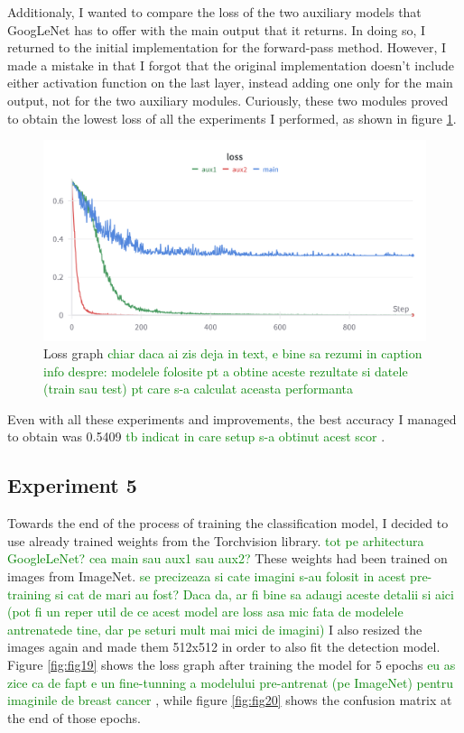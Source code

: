 Additionaly, I wanted to compare the loss of the two auxiliary models that GoogLeNet has to offer with the main output that it returns. In doing so, I returned to the initial implementation for the forward-pass method. However, I made a mistake in that I forgot that the original implementation doesn't include either activation function on the last layer, instead adding one only for the main output, not for the two auxiliary modules. Curiously, these two modules proved to obtain the lowest loss of all the experiments I performed, as shown in figure \ref{fig:fig18}.

\begin{figure}[!ht]
    \centering
    \includegraphics[width=1\linewidth]{figures/Figure19.png}
    \caption{Loss graph
    \textcolor{green}{chiar daca ai zis deja in text, e bine sa rezumi in caption info despre: modelele folosite pt a obtine aceste rezultate si datele (train sau test) pt care s-a calculat aceasta performanta}
    }
    \label{fig:fig18}
\end{figure}

Even with all these experiments and improvements, the best accuracy I managed to obtain was 0.5409
\textcolor{green}{tb indicat in care setup s-a obtinut acest scor}
.

\subsection{Experiment 5}

Towards the end of the process of training the classification model, I decided to use already trained weights from the Torchvision library.
\textcolor{green}{tot pe arhitectura GoogleLeNet? cea main sau aux1 sau aux2?} 
These weights had been trained on images from ImageNet.
\textcolor{green}{se precizeaza si cate imagini s-au folosit in acest pre-training si cat de mari au fost? Daca da, ar fi bine sa adaugi aceste detalii si aici (pot fi un reper util de ce acest model are loss asa mic fata de modelele antrenatede tine, dar pe seturi mult mai mici de imagini)} 
I also resized the images again and made them 512x512 in order to also fit the detection model. Figure \ref{fig:fig19} shows the loss graph after training the model for 5 epochs
\textcolor{green}{eu as zice ca de fapt e un fine-tunning a modelului pre-antrenat (pe ImageNet) pentru imaginile de breast cancer}
, while figure \ref{fig:fig20} shows the confusion matrix at the end of those epochs.

